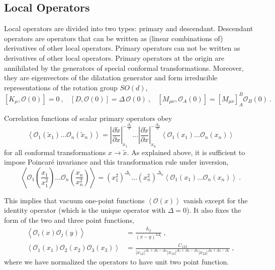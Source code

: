 \documentclass{ws-rv9x6}
\newcommand\be{\begin{equation}}
\newcommand\ee{\end{equation}}
\begin{document}
\subsection{Local Operators}

Local operators are divided into two types: primary and descendant.
Descendant operators are operators that can be written as (linear
combinations of) derivatives of other local operators. Primary operators
can not be written as derivatives of other local operators. Primary
operators at the origin are annihilated by the generators of special
conformal transformations. Moreover, they are eigenvectors of the
dilatation generator and form irreducible representations of the rotation
group $SO(d)$,
\be
\left[K_{\mu},\mathcal{O}(0)\right]=0\ ,\ \ \ \ 
\left[D,\mathcal{O}(0)\right]=\Delta\,\mathcal{O}(0)\ ,\ \ \ \ 
\left[M_{\mu\nu},\mathcal{O}_{A}(0)\right]=\left[M_{\mu\nu}\right]_{A}^{B}\mathcal{O}_{B}(0)\ .
\nonumber
\ee


Correlation functions of scalar primary operators obey
\begin{equation}
\left\langle \mathcal{O}_{1}(\tilde{x}_{1})\dots\mathcal{O}_{n}(\tilde{x}_{n})\right\rangle =\left|\frac{\partial\tilde{x}}{\partial x}\right|_{x_{1}}^{-\frac{\Delta_{1}}{d}}\dots\left|\frac{\partial\tilde{x}}{\partial x}\right|_{x_{n}}^{-\frac{\Delta_{n}}{d}}\left\langle \mathcal{O}_{1}(x_{1})\dots\mathcal{O}_{n}(x_{n})\right\rangle \label{eq:conftransfcorrelators}
\end{equation}
 for all conformal transformations $x\to\tilde{x}$. As explained
above, it is sufficient to impose Poincaré invariance and this transformation
rule under inversion, %
\be
\left\langle \mathcal{O}_{1}\left(\frac{x_{1}}{x_{1}^{2}}\right)\dots\mathcal{O}_{n}\left(\frac{x_{n}}{x_{n}^{2}}\right)\right\rangle =\left(x_{1}^{2}\right)^{\Delta_{1}}\dots\left(x_{n}^{2}\right)^{\Delta_{n}}\left\langle \mathcal{O}_{1}(x_{1})\dots\mathcal{O}_{n}(x_{n})\right\rangle \ . \nonumber
\ee


This implies that vacuum one-point functions $\left\langle \mathcal{O}(x)\right\rangle $
vanish except for the identity operator (which is the unique operator
with $\Delta=0$). It also fixes the form of the two and three point
functions,
\begin{align}
\left\langle \mathcal{O}_{i}(x)\mathcal{O}_{j}(y)\right\rangle &=\frac{\delta_{ij}}{\left(x-y\right)^{2\Delta_{i}}}\ ,\\
\left\langle \mathcal{O}_{1}(x_{1})\mathcal{O}_{2}(x_{2})\mathcal{O}_{3}(x_{3})\right\rangle &=\frac{C_{123}}{\left|x_{12}\right|^{\Delta_{1}+\Delta_{2}-\Delta_{3}}\left|x_{13}\right|^{\Delta_{1}+\Delta_{3}-\Delta_{2}}\left|x_{23}\right|^{\Delta_{2}+\Delta_{3}-\Delta_{1}}}\ ,\nonumber
\end{align}
where we have normalized the operators to have unit two point function.
\end{document}
